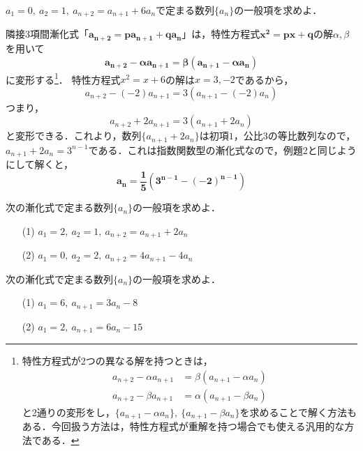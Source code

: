 \documentclass[a4paper,11pt]{ltjsarticle}
\begin{document}
\begin{exque}
         $a_1=0,~a_2=1,~a_{n+2}=a_{n+1}+6a_n$で定まる数列$\{a_n\}$の一般項を求めよ．
\end{exque}
隣接3項間漸化式「$\boldsymbol{a_{n+2}=pa_{n+1}+qa_n}$」は，特性方程式$\boldsymbol{x^2=px+q}$の解$\alpha,\beta$を用いて
  \[
    \boldsymbol{a_{n+2}-\alpha a_{n+1}=\beta(a_{n+1}-\alpha a_n)}
\]
  に変形する\footnote{特性方程式が2つの異なる解を持つときは，
  \begin{align*}
  a_{n+2}-\alpha a_{n+1}&=\beta(a_{n+1}-\alpha a_n)\\
  a_{n+2}-\beta a_{n+1}&=\alpha(a_{n+1}-\beta a_n)
  \end{align*}
  と2通りの変形をし，$\{a_{n+1}-\alpha a_n\},~\{a_{n+1}-\beta a_n\}$を求めることで解く方法もある．今回扱う方法は，特性方程式が重解を持つ場合でも使える汎用的な方法である．}．
  \ans 
  特性方程式$x^2=x+6$の解は$x=3,-2$であるから，
  \[a_{n+2}-(-2)a_{n+1}=3(a_{n+1}-(-2)a_n)\]
  つまり，\[a_{n+2}+2a_{n+1}=3(a_{n+1}+2a_n)\]
  と変形できる．これより，数列$\{a_{n+1}+2a_n\}$は初項$1$，公比3の等比数列なので，$a_{n+1}+2a_n=3^{n-1}$である．これは指数関数型の漸化式なので，例題2と同じようにして解くと，
  \[ \boldsymbol{a_n=\frac15\left(3^{n-1}-(-2)^{n-1}\right)}\]
   \begin{toi}
次の漸化式で定まる数列$\{a_n\}$の一般項を求めよ．\\
\begin{minipage}{0.5\linewidth}
\begin{itemize}
    \item [(1)]    $a_1=2,~a_2=1,~a_{n+2}=a_{n+1}+2a_n$
\end{itemize}
\end{minipage}
\begin{minipage}{0.5\linewidth}
\begin{itemize}
    \item [(2)]$a_1=0,~a_2=2,~a_{n+2}=4a_{n+1}-4a_n$
\end{itemize}
\end{minipage}
\end{toi}
\newpage
{}
\begin{toi}
次の漸化式で定まる数列$\{a_n\}$の一般項を求めよ．\\
\begin{minipage}{0.5\linewidth}
\begin{itemize}
    \item [(1)]$a_1=6,~a_{n+1}=3a_n-8$
\end{itemize}
\end{minipage}
\begin{minipage}{0.5\linewidth}
\begin{itemize}
    \item [(2)]$a_1=2,~a_{n+1}=6a_n-15$
\end{itemize}
\end{minipage}

\end{toi}
\end{document}
